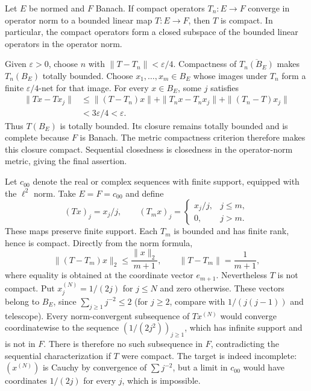 \begin{theorem}
\label{thm:compact_operator_norm_limit}
Let $E$ be normed and $F$ Banach. If compact operators $T_n:E\to F$
converge in operator norm to a bounded linear map $T:E\to F$, then
$T$ is compact. In particular, the compact operators form a closed
subspace of the bounded linear operators in the operator norm.
\end{theorem}
\Proof
Given $\varepsilon>0$, choose $n$ with
$\|T-T_n\|<\varepsilon/4$. Compactness of
$\overline{T_n(B_E)}$ makes $T_n(B_E)$ totally bounded. Choose
$x_1,\ldots,x_m\in B_E$ whose images under $T_n$ form a finite
$\varepsilon/4$-net for that image. For every $x\in B_E$, some
$j$ satisfies
\[
\begin{split}
\|Tx-Tx_j\|
&\leq\|(T-T_n)x\|+\|T_nx-T_nx_j\|+\|(T_n-T)x_j\|\\
&<3\varepsilon/4<\varepsilon.
\end{split}
\]
Thus $T(B_E)$ is totally bounded. Its closure remains totally bounded
and is complete because $F$ is Banach. The metric compactness criterion
therefore makes this closure compact. Sequential closedness is
closedness in the operator-norm metric, giving the final assertion.
\Done

\begin{example}
Let $c_{00}$ denote the real or complex sequences with finite support,
equipped with the $\ell^2$ norm. Take $E=F=c_{00}$ and define
\[
(Tx)_j=x_j/j,\qquad
(T_mx)_j=\begin{cases}x_j/j,&j\leq m,\\0,&j>m.\end{cases}
\]
These maps preserve finite support. Each $T_m$ is bounded and has
finite rank, hence is compact. Directly from the norm formula,
\[
\|(T-T_m)x\|_2\leq\frac{\|x\|_2}{m+1},\qquad
\|T-T_m\|=\frac1{m+1},
\]
where equality is obtained at the coordinate vector $e_{m+1}$.
Nevertheless $T$ is not compact. Put
$x^{(N)}_j=1/(2j)$ for $j\leq N$ and zero otherwise. These vectors
belong to $B_E$, since
$\sum_{j\geq1}j^{-2}\leq2$ (for $j\geq2$, compare with
$1/(j(j-1))$ and telescope). Every norm-convergent subsequence of
$Tx^{(N)}$ would converge coordinatewise to the sequence
$(1/(2j^2))_{j\geq1}$, which has infinite support and is not in $F$.
There is therefore no such subsequence in $F$, contradicting the
sequential characterization if $T$ were compact.
The target is indeed incomplete: $(x^{(N)})$ is Cauchy by convergence
of $\sum j^{-2}$, but a limit in $c_{00}$ would have coordinates
$1/(2j)$ for every $j$, which is impossible.
\end{example}

